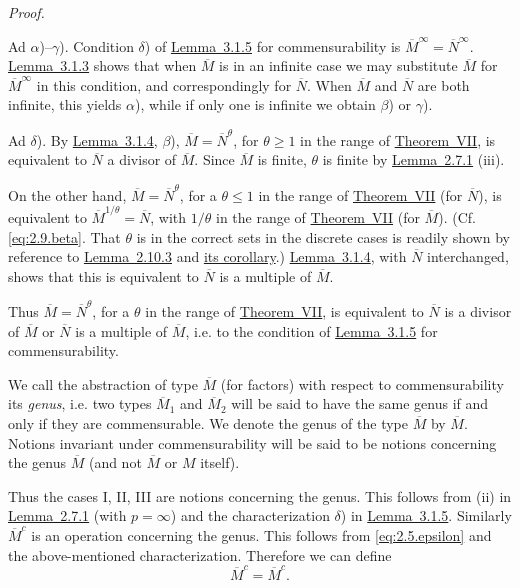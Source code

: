 \documentclass[b5paper,twoside]{article}
\newcommand{\thmref}[2]{\hyperref[#1]{\mbox{Theorem~#2}}}
\newcommand{\lemref}[2]{\hyperref[#1]{\mbox{Lemma~#2}}}
\theoremstyle{mvnplain}
\renewenvironment{proof}[1][Proof]{%
  \par\addvspace{0.35\baselineskip}%
  \noindent\textit{#1.}\ \normalfont\ignorespaces
}{%
  \par\addvspace{0.35\baselineskip}%
}
\newcommand{\M}{\mathbf M}
\newcommand{\N}{\mathbf N}
\def\M{M}%
\def\N{N}%
\def\widetilde#1{#1}%
\begin{document}
\begin{proof}
Ad \(\alpha\))--\(\gamma\)). Condition \(\delta\)) of
\lemref{lem:3.1.5}{3.1.5} for commensurability is
\(\overline{\M}^{\infty}=\overline{\N}^{\infty}\).
\lemref{lem:3.1.3}{3.1.3} shows that when \(\overline{\M}\) is in an infinite
case we may substitute \(\overline{\M}\) for \(\overline{\M}^{\infty}\) in
this condition, and correspondingly for \(\overline{\N}\). When
\(\overline{\M}\) and \(\overline{\N}\) are both infinite, this yields
\(\alpha\)), while if only one is infinite we obtain \(\beta\)) or
\(\gamma\)).

Ad \(\delta\)). By \lemref{lem:3.1.4}{3.1.4}, \(\beta\)),
\(\overline{\M}=\overline{\N}^{\theta}\), for \(\theta\geq1\) in the range
of \thmref{thm:VII}{VII}, is equivalent to \(\overline{\N}\) a divisor of
\(\overline{\M}\). Since \(\overline{\M}\) is finite, \(\theta\) is finite
by \lemref{lem:2.7.1}{2.7.1} (iii).

On the other hand, \(\overline{\M}=\overline{\N}^{\theta}\), for a
\(\theta\leq1\) in the range of \thmref{thm:VII}{VII} (for
\(\overline{\N}\)), is equivalent to
\(\overline{\M}^{1/\theta}=\overline{\N}\), with \(1/\theta\) in the range
of \thmref{thm:VII}{VII} (for \(\overline{\M}\)). (Cf.
\eqref{eq:2.9.beta}. That \(\theta\) is in the correct sets in the discrete
cases is readily shown by reference to \lemref{lem:2.10.3}{2.10.3} and
\hyperref[cor:2.10.3]{its corollary}.) \lemref{lem:3.1.4}{3.1.4}, with
\(\overline{\N}\) interchanged, shows that this is equivalent to
\(\overline{\N}\) is a multiple of \(\overline{\M}\).

Thus \(\overline{\M}=\overline{\N}^{\theta}\), for a \(\theta\) in the range
of \thmref{thm:VII}{VII}, is equivalent to \(\overline{\N}\) is a divisor of
\(\overline{\M}\) or \(\overline{\N}\) is a multiple of
\(\overline{\M}\), i.e. to the condition of \lemref{lem:3.1.5}{3.1.5} for
commensurability.
\end{proof}

We call the abstraction of type \(\overline{\M}\) (for factors) with respect
to commensurability its \emph{genus}, i.e. two types
\(\overline{\M}_1\) and \(\overline{\M}_2\) will be said to have the same
genus if and only if they are commensurable. We denote the genus of the type
\(\overline{\M}\) by \(\widetilde{\overline{\M}}\). Notions invariant under
commensurability will be said to be notions concerning the genus
\(\widetilde{\overline{\M}}\) (and not \(\overline{\M}\) or \(\M\) itself).

Thus the cases I, II, III are notions concerning the genus. This follows from
(ii) in \lemref{lem:2.7.1}{2.7.1} (with \(p=\infty\)) and the
characterization \(\delta\)) in \lemref{lem:3.1.5}{3.1.5}.
Similarly \(\overline{\M}^{c}\) is an operation concerning the genus. This
follows from \eqref{eq:2.5.epsilon} and the above-mentioned characterization.
Therefore we can define
\[
 \widetilde{\overline{\M}}^{c}
 =\widetilde{\overline{\M}^{c}}.
\]
\end{document}
